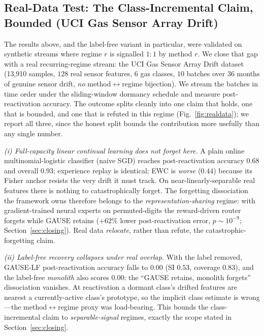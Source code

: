 \documentclass{article}
\begin{document}
\subsection{Real-Data Test: The Class-Incremental Claim, Bounded
(UCI Gas Sensor Array Drift)}
\label{sec:realdata}

The results above, and the label-free variant in particular, were validated on
synthetic streams where regime $r$ is signalled $1{:}1$ by method $r$. We close
that gap with a real recurring-regime stream: the UCI Gas Sensor Array Drift
dataset (13{,}910 samples, $128$ real sensor features, $6$ gas classes, $10$ batches
over $36$ months of genuine sensor drift, \emph{no} method$\leftrightarrow$regime
bijection). We stream the batches in time order under the sliding-window dormancy
schedule and measure post-reactivation accuracy. The outcome splits cleanly into
one claim that holds, one that is bounded, and one that is refuted in this regime
(Fig.~\ref{fig:realdata}); we report all three, since the honest split bounds the
contribution more usefully than any single number.

\emph{(i) Full-capacity linear continual learning does not forget here.} A plain
online multinomial-logistic classifier (naive SGD) reaches post-reactivation
accuracy $0.68$ and overall $0.93$; experience replay is identical; EWC is
\emph{worse} ($0.44$) because its Fisher anchor resists the very drift it must track.
On near-linearly-separable real features there is nothing to catastrophically
forget. The forgetting dissociation the framework owns therefore belongs to the
\emph{representation-sharing} regime: with gradient-trained neural experts on
permuted-digits the reward-driven router forgets while GAUSE retains ($+62\%$ lower
post-reactivation error, $p\sim10^{-9}$; Section~\ref{sec:closing}). Real data
\emph{relocate}, rather than refute, the catastrophic-forgetting claim.

\emph{(ii) Label-free recovery collapses under real overlap.} With the label removed,
GAUSE-LF post-reactivation accuracy falls to $0.00$ (SI $0.53$, coverage $0.83$), and
the label-free \emph{monolith} also scores $0.00$: the ``GAUSE retains, monolith
forgets'' dissociation vanishes. At reactivation a dormant class's drifted features
are nearest a currently-active class's prototype, so the implicit class estimate is
wrong---the method$\leftrightarrow$regime proxy was load-bearing. This bounds the
class-incremental claim to \emph{separable-signal} regimes, exactly the scope stated
in Section~\ref{sec:closing}.
\end{document}
